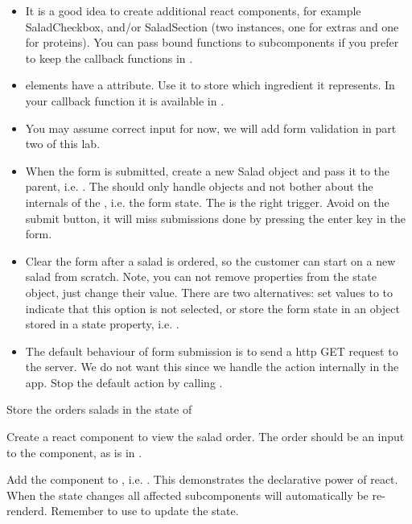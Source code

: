\documentclass[fleqn, article, a4paper]{memoir}
\begin{document}
\begin{Assignments}
\begin{itemize}
  \item It is a good idea to create additional react components, for example SaladCheckbox, and/or SaladSection (two instances, one for extras and one for proteins). You can pass bound functions to subcomponents if you prefer to keep the callback functions in .
  \item {} elements have a  attribute. Use it to store which ingredient it represents. In your callback function it is available in .
  \item You may assume correct input for now, we will add form validation in part two of this lab.
  \item When the form is submitted, create a new Salad object and pass it to the parent, i.e. . The  should only handle  objects and not bother about the internals of the , i.e. the form state. The  is the right trigger. Avoid  on the submit button, it will miss submissions done by pressing the enter key in the form.
  \item Clear the form after a salad is ordered, so the customer can start on a new salad from scratch. Note, you can not remove properties from the state object, just change their value. There are two alternatives: set values to  to indicate that this option is not selected, or store the form state in an object stored in a state property, i.e. .
  \item The default behaviour of form submission is to send a http GET request to the server. We do not want this since we handle the action internally in the app. Stop the default action by calling .
\end{itemize}

\item Store the orders salads in the state of 

\item Create a react component to view the salad order. The order should be an input to the component, as  is in .

\item Add the  component to , i.e. . This demonstrates the declarative power of react. When the state changes all affected subcomponents will automatically be re-renderd. Remember to use  to update the state.


\end{Assignments}
\end{document}

